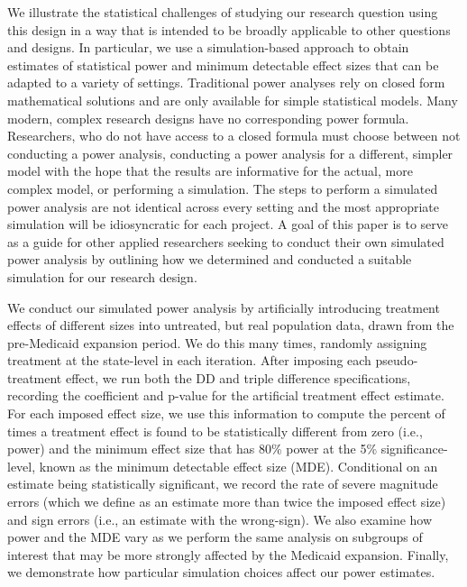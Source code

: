 \documentclass[12pt]{article}%
\begin{document}
We illustrate the statistical challenges of studying our research question using this design in a way that is intended to be broadly applicable to other questions and designs. 
In particular, we use a simulation-based approach to obtain estimates of statistical power and minimum detectable effect sizes that can be adapted to a variety of settings. 
Traditional power analyses rely on closed form mathematical solutions and are only available for simple statistical models.
Many modern, complex research designs have no corresponding power formula.  
Researchers, who do not have access to a closed formula must choose between not conducting a power analysis, conducting a power analysis for a different, simpler model with the hope that the results are informative for the actual, more complex model, or performing a simulation. 
The steps to perform a simulated power analysis are not identical across every setting and the most appropriate simulation will be idiosyncratic for each project. 
A goal of this paper is to serve as a guide for other applied researchers seeking to conduct their own simulated power analysis by outlining how we determined and conducted a suitable simulation for our research design.

We conduct our simulated power analysis by artificially introducing treatment effects of different sizes into untreated, but real population data, drawn from the pre-Medicaid expansion period. 
We do this many times, randomly assigning treatment at the state-level in each iteration.  
After imposing each pseudo-treatment effect, we run both the DD and triple difference specifications, recording the coefficient and p-value for the artificial treatment effect estimate. 
For each imposed effect size, we use this information to compute the percent of times a treatment effect is found to be statistically different from zero (i.e., power) and the minimum effect size that has 80\% power at the 5\% significance-level, known as the minimum detectable effect size (MDE). 
Conditional on an estimate being statistically significant, we record the rate of severe magnitude errors (which we define as an estimate more than twice the imposed effect size) and sign errors (i.e., an estimate with the wrong-sign). 
We also examine how power and the MDE vary as we perform the same analysis on subgroups of interest that may be more strongly affected by the Medicaid expansion. 
Finally, we demonstrate how particular simulation choices affect our power estimates. 
\end{document}
